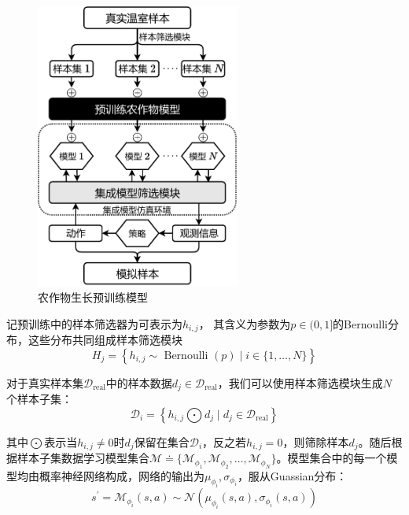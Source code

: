 \begin{figure}[ht]
\centering
\includegraphics[width=0.6\textwidth]{figures/pre-train-model.pdf}
\caption{农作物生长预训练模型}
\label{fig:pre-train-model}
\end{figure}

记预训练中的样本筛选器为可表示为$h_{i,j}$， 其含义为参数为$p\in(0, 1]$的Bernoulli分布，这些分布共同组成样本筛选模块
\begin{equation}
    H_{j}=\left\{h_{i,j} \sim \text { Bernoulli }(p) \mid i \in\{1, \ldots, N\}\right\}
\end{equation}

对于真实样本集$\mathcal{D}_{\text{real}}$中的样本数据$d_j\in\mathcal{D}_{\text{real}}$，我们可以使用样本筛选模块生成$N$个样本子集：
\begin{equation}
    \mathcal{D}_i=\left\{h_{i,j}\bigodot d_j\mid d_j\in\mathcal{D}_{\text{real}}\right\}
\end{equation}

其中$\bigodot$表示当$h_{i,j}\neq 0$时$d_j$保留在集合$\mathcal{D}_i$，反之若$h_{i,j}=0$，则筛除样本$d_j$。随后根据样本子集数据学习模型集合$\mathcal{M} \doteq \{\mathcal{M}_{\phi_1},\mathcal{M}_{\phi_2},\ldots,\mathcal{M}_{\phi_N}\}$。模型集合中的每一个模型均由概率神经网络构成，网络的输出为$\mu_{\phi_i},\sigma_{\phi_i}$，服从Guassian分布：
\begin{equation}
    s^\prime = \mathcal{M}_{\phi_i}(s,a) \sim \mathcal{N}(\mu_{\phi_i}(s,a),\sigma_{\phi_i}(s,a))
\end{equation}


